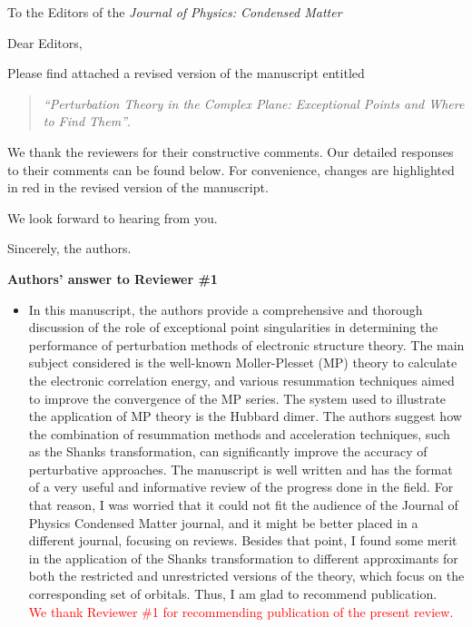 \documentclass[10pt]{letter}
\newcommand{\alert}[1]{\textcolor{red}{#1}}
\begin{document}
\begin{letter}%
{To the Editors of the \textit{Journal of Physics: Condensed Matter}}

\opening{Dear Editors,}

\justifying
Please find attached a revised version of the manuscript entitled 
\begin{quote}
	\textit{``Perturbation Theory in the Complex Plane: Exceptional Points and Where to Find Them''}.
\end{quote}
We thank the reviewers for their constructive comments.
Our detailed responses to their comments can be found below.
For convenience, changes are highlighted in red in the revised version of the manuscript. 

We look forward to hearing from you.

\closing{Sincerely, the authors.}

\noindent \textbf{\large Authors' answer to Reviewer \#1}

\begin{itemize}

	\item 
	{In this manuscript, the authors provide a comprehensive and thorough discussion of the role of exceptional point singularities in determining the performance of perturbation methods of electronic structure theory. 
	The main subject considered is the well-known Moller-Plesset (MP) theory to calculate the electronic correlation energy, and various resummation techniques aimed to improve the convergence of the MP series. 
	The system used to illustrate the application of MP theory is the Hubbard dimer. 
	The authors suggest how the combination of resummation methods and acceleration techniques, such as the Shanks transformation, can significantly improve the accuracy of perturbative approaches. 
	The manuscript is well written and has the format of a very useful and informative review of the progress done in the field. 
	For that reason, I was worried that it could not fit the audience of the Journal of Physics Condensed Matter journal, and it might be better placed in a different journal, focusing on reviews. 
	Besides that point, I found some merit in the application of the Shanks transformation to different approximants for both the restricted and unrestricted versions of the theory, which focus on the corresponding set of orbitals. 
	Thus, I am glad to recommend publication.}
	\\
	\alert{We thank Reviewer \#1 for recommending publication of the present review.}
	

\end{itemize}
\end{letter}
\end{document}
